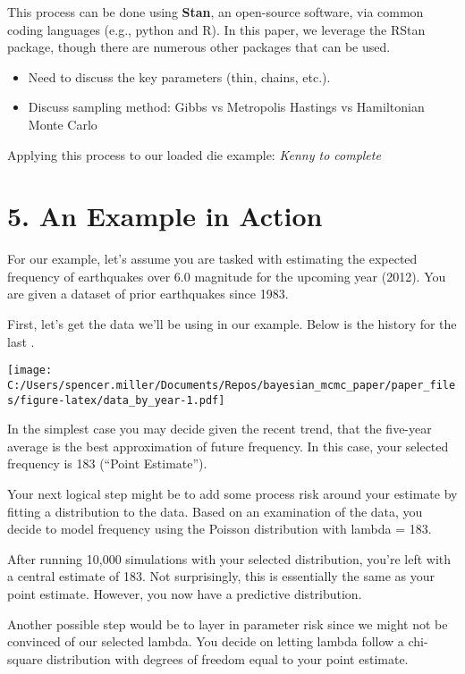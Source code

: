 \documentclass[
]{article}
\providecommand{\tightlist}{%
  \setlength{\itemsep}{0pt}\setlength{\parskip}{0pt}}
\begin{document}
This process can be done using \textbf{Stan}, an open-source software,
via common coding languages (e.g., python and R). In this paper, we
leverage the RStan package, though there are numerous other packages
that can be used.

\begin{itemize}
\tightlist
\item
  Need to discuss the key parameters (thin, chains, etc.).
\item
  Discuss sampling method: Gibbs vs Metropolis Hastings vs Hamiltonian
  Monte Carlo
\end{itemize}

Applying this process to our loaded die example: \emph{Kenny to
complete}

\hypertarget{an-example-in-action}{%
\section{5. An Example in Action}\label{an-example-in-action}}

For our example, let's assume you are tasked with estimating the
expected frequency of earthquakes over 6.0 magnitude for the upcoming
year (2012). You are given a dataset of prior earthquakes since 1983.

First, let's get the data we'll be using in our example. Below is the
history for the last .

\texttt{[image: C:/Users/spencer.miller/Documents/Repos/bayesian\_mcmc\_paper/paper\_files/figure-latex/data\_by\_year-1.pdf]}

In the simplest case you may decide given the recent trend, that the
five-year average is the best approximation of future frequency. In this
case, your selected frequency is 183 (``Point Estimate'').

Your next logical step might be to add some process risk around your
estimate by fitting a distribution to the data. Based on an examination
of the data, you decide to model frequency using the Poisson
distribution with lambda = 183.

After running 10,000 simulations with your selected distribution, you're
left with a central estimate of 183. Not surprisingly, this is
essentially the same as your point estimate. However, you now have a
predictive distribution.

Another possible step would be to layer in parameter risk since we might
not be convinced of our selected lambda. You decide on letting lambda
follow a chi-square distribution with degrees of freedom equal to your
point estimate.
\end{document}
